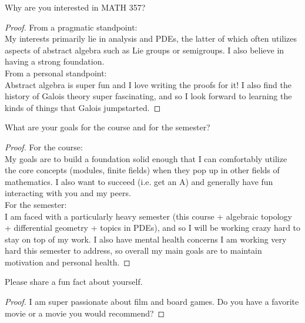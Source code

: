 \documentclass[num=0,duedate=01-27-21,course=Abstract\ Algebra\ II,proflastname=Walton]{hwtemplate}
\begin{document}
\problem[5]
\begin{claim}
	Why are you interested in MATH 357?
\end{claim}
\begin{proof}
From a pragmatic standpoint:\\
My interests primarily lie in analysis and PDEs, the latter of which often utilizes aspects of abstract algebra such as Lie groups or semigroups. I also believe in having a strong foundation.\\

From a personal standpoint:\\
Abstract algebra is super fun and I love writing the proofs for it! I also find the history of Galois theory super fascinating, and so I look forward to learning the kinds of things that Galois jumpstarted.
\end{proof}

\problem[6]
\begin{claim}
	What are your goals for the course and for the semester?
\end{claim}
\begin{proof}
For the course:\\
My goals are to build a foundation solid enough that I can comfortably utilize the core concepts (modules, finite fields) when they pop up in other fields of mathematics. I also want to succeed (i.e. get an A) and generally have fun interacting with you and my peers.\\

For the semester:\\
I am faced with a particularly heavy semester (this course + algebraic topology + differential geometry + topics in PDEs), and so I will be working crazy hard to stay on top of my work. I also have mental health concerns I am working very hard this semester to address, so overall my main goals are to maintain motivation and personal health.
\end{proof}

\problem[7]
\begin{claim}
	Please share a fun fact about yourself.
\end{claim}
\begin{proof}
I am super passionate about film and board games. Do you have a favorite movie or a movie you would recommend?
\end{proof}
\end{document}
